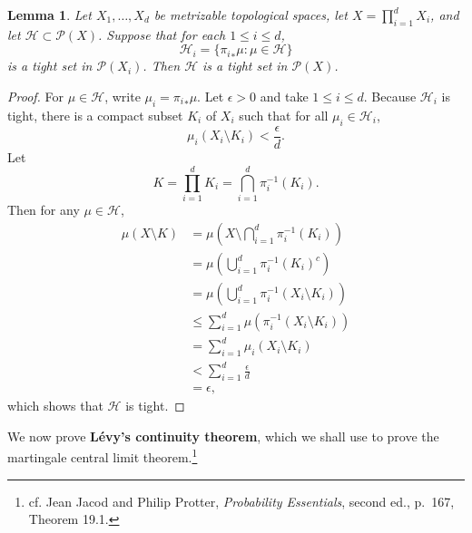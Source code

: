 \documentclass{article}
\newtheorem{lemma}[theorem]{Lemma}
\theoremstyle{definition}
\begin{document}
\begin{lemma}
Let $X_1,\ldots,X_d$ be metrizable topological spaces, let
$X=\prod_{i=1}^d X_i$,  and let $\mathscr{H} \subset \mathscr{P}(X)$.
Suppose that for each $1 \leq i \leq d$,
\[
\mathscr{H}_i = \{{\pi_i}_*\mu: \mu \in \mathscr{H}\}
\]
is a tight set in $\mathscr{P}(X_i)$. Then $\mathscr{H}$ is a tight set in $\mathscr{P}(X)$.
\label{producttight}
\end{lemma}
\begin{proof}
For $\mu \in \mathscr{H}$, write $\mu_i = {\pi_i}_* \mu$.
Let $\epsilon>0$ and take $1 \leq i \leq d$. 
Because $\mathscr{H}_i$ is tight,
there is a compact subset $K_i$ of $X_i$ such that for all $\mu_i \in \mathscr{H}_i$,
\[
\mu_i(X_i \setminus K_i) < \frac{\epsilon}{d}.
\]
Let
\[
K=\prod_{i=1}^d K_i =  \bigcap_{i=1}^d \pi_i^{-1}(K_i).
\]
Then for any $\mu \in \mathscr{H}$,
\begin{align*}
\mu(X \setminus K)&=\mu\left(X \setminus \bigcap_{i=1}^d \pi_i^{-1}(K_i) \right)\\
&=\mu\left( \bigcup_{i=1}^d \pi_i^{-1}(K_i)^c \right)\\
&=\mu\left( \bigcup_{i=1}^d \pi_i^{-1}(X_i \setminus K_i) \right)\\
&\leq \sum_{i=1}^d \mu(\pi_i^{-1}(X_i \setminus K_i))\\
&=\sum_{i=1}^d \mu_i(X_i \setminus K_i)\\
&< \sum_{i=1}^d \frac{\epsilon}{d}\\
&=\epsilon,
\end{align*}
which shows that $\mathscr{H}$ is tight.
\end{proof}




We now prove \textbf{Lévy's continuity theorem}, which we shall use to prove the martingale central limit theorem.\footnote{cf. Jean Jacod and Philip Protter, {\em Probability Essentials}, second ed., p.~167, Theorem 19.1.}
\end{document}
